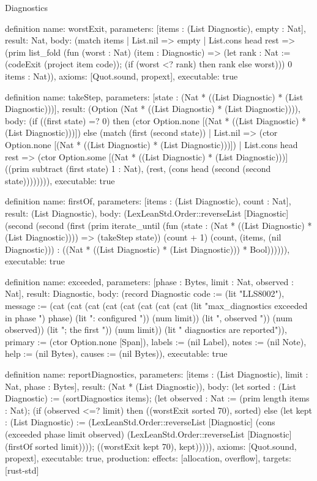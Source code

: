 \begin{lexlean}{Diagnostics}
\begin{semanticmodule}
definition{
  name: worstExit,
  parameters: [items : (List Diagnostic), empty : Nat],
  result: Nat,
  body: (match items
    | List.nil => empty
    | List.cons head rest => (prim list_fold (fun (worst : Nat) (item : Diagnostic) => (let rank : Nat := (codeExit (project item code)); (if (worst <? rank) then rank else worst))) 0 items : Nat)),
  axioms: [Quot.sound, propext],
  executable: true
}

definition{
  name: takeStep,
  parameters: [state : (Nat * ((List Diagnostic) * (List Diagnostic)))],
  result: (Option (Nat * ((List Diagnostic) * (List Diagnostic)))),
  body: (if ((first state) =? 0) then (ctor Option.none [(Nat * ((List Diagnostic) * (List Diagnostic)))]) else (match (first (second state))
    | List.nil => (ctor Option.none [(Nat * ((List Diagnostic) * (List Diagnostic)))])
    | List.cons head rest => (ctor Option.some [(Nat * ((List Diagnostic) * (List Diagnostic)))] ((prim subtract (first state) 1 : Nat), (rest, (cons head (second (second state)))))))),
  executable: true
}

definition{
  name: firstOf,
  parameters: [items : (List Diagnostic), count : Nat],
  result: (List Diagnostic),
  body: (LexLeanStd.Order::reverseList [Diagnostic] (second (second (first (prim iterate_until (fun (state : (Nat * ((List Diagnostic) * (List Diagnostic)))) => (takeStep state)) (count + 1) (count, (items, (nil Diagnostic))) : ((Nat * ((List Diagnostic) * (List Diagnostic))) * Bool)))))),
  executable: true
}

definition{
  name: exceeded,
  parameters: [phase : Bytes, limit : Nat, observed : Nat],
  result: Diagnostic,
  body: (record Diagnostic {code := (lit "LLS8002"), message := (cat (cat (cat (cat (cat (cat (cat (cat (lit "max_diagnostics exceeded in phase ") phase) (lit ": configured ")) (num limit)) (lit ", observed ")) (num observed)) (lit "; the first ")) (num limit)) (lit " diagnostics are reported")), primary := (ctor Option.none [Span]), labels := (nil Label), notes := (nil Note), help := (nil Bytes), causes := (nil Bytes)}),
  executable: true
}

definition{
  name: reportDiagnostics,
  parameters: [items : (List Diagnostic), limit : Nat, phase : Bytes],
  result: (Nat * (List Diagnostic)),
  body: (let sorted : (List Diagnostic) := (sortDiagnostics items); (let observed : Nat := (prim length items : Nat); (if (observed <=? limit) then ((worstExit sorted 70), sorted) else (let kept : (List Diagnostic) := (LexLeanStd.Order::reverseList [Diagnostic] (cons (exceeded phase limit observed) (LexLeanStd.Order::reverseList [Diagnostic] (firstOf sorted limit)))); ((worstExit kept 70), kept))))),
  axioms: [Quot.sound, propext],
  executable: true,
  production: {effects: [allocation, overflow], targets: [rust-std]}
}
\end{semanticmodule}
\end{lexlean}
